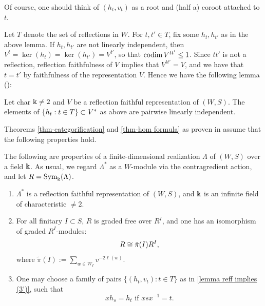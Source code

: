 Of course, one should think of $(h_t, v_t)$ as a root and (half a) coroot attached to $t$.






Let $T$ denote the set of reflections in $W$. For $t,t'\in T$, fix some $h_t, h_{t'}$ as in the above lemma. If $h_t, h_{t'}$ are not linearly independent, then $V^t=\ker(h_t)=\ker(h_{t'})=V^{t'}$, so that $\operatorname{codim} V^{tt'}\leq 1$. 
Since $tt'$ is not a reflection, reflection faithfulness of $V$ implies that $V^{tt'}=V$, and we have that $t=t'$ by faithfulness of the representation $V$.
Hence we have the following lemma (\cite[Lemma 4.1.4]{WillSingular}):
\begin{lemma}\label{lemma coroots are linearly independent}
     Let char $\Bbbk \neq 2$ and $V$ be a reflection faithful representation of $(W,S)$. The elements of $\{h_t: t \in T\} \subset V^*$ as above are pairwise linearly independent.
\end{lemma}

Theorems \ref{thm-categorification} and \ref{thm-hom formula} as proven in \cite{WillSingular} assume that the following properties hold.

\begin{property} \label{willassume} The following are properties of a finite-dimensional realization $\Lambda$ of $(W,S)$ over a field $\Bbbk$. As usual, we regard $\Lambda^*$ as a $W$-module via the contragredient action, and let $R = \operatorname{Sym}_{\Bbbk}(\Lambda)$.

\begin{enumerate}
    \item $\Lambda^*$ is a reflection faithful representation of $(W,S)$, and  $\Bbbk$ is an infinite field of characteristic $\ne 2$. \label{assumption 1}
    \item For all finitary $I \subset S$, $R$ is graded free over $R^I$, and one has an isomorphism of graded $R^I$-modules: 
    $$R \cong \Tilde{\pi}(I)R^I,$$
    where $\tilde{\pi}(I):= \displaystyle \sum_{w \in W_I}v^{-2\ell(w)}.$\label{assumption 2}
    \item One may choose a family of pairs $\{(h_t, v_t) \colon t \in T\}$ as in \cref{lemma reff implies (3')}, such that
    $$xh_s = h_t \text{ if } xsx^{-1} = t.$$
    \label{assumption 3}
\end{enumerate}
\end{property}

